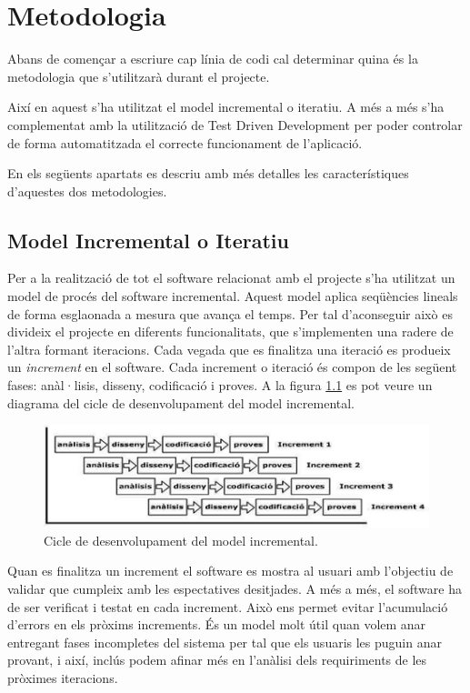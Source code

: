 \chapter{Metodologia}
\label{chap:metodologia}

Abans de començar a escriure cap línia de codi cal determinar quina és la metodologia que s'utilitzarà durant el projecte. 

Així en aquest s'ha utilitzat el model incremental o iteratiu. A més a més s'ha complementat amb la utilització de Test Driven Development per poder controlar de forma automatitzada el correcte funcionament de l'aplicació.

En els següents apartats es descriu amb més detalles les característiques d'aquestes dos metodologies.  


\section{Model Incremental o Iteratiu}

Per a la realització de tot el software relacionat amb el projecte s’ha utilitzat un model de procés del software incremental. Aquest model aplica seqüències lineals de forma esglaonada a mesura que avança el temps. Per tal d'aconseguir això es divideix el projecte en diferents funcionalitats, que s'implementen una radere de l'altra formant iteracions. Cada vegada que es finalitza una iteració es produeix un \emph{increment} en el software. Cada increment o iteració és compon de les següent fases: anàl·lisis, disseny, codificació i proves. A la figura \ref{fig:mii} es pot veure un diagrama del cicle de desenvolupament del model incremental.

\begin{figure}[htbp]
\centering\includegraphics[width=12cm]{img/model-incremental.png}
\caption{Cicle de desenvolupament del model incremental.}
\label{fig:mii}
\end{figure} 

Quan es finalitza un increment el software es mostra al usuari amb l'objectiu de validar que cumpleix amb les espectatives desitjades. A més a més, el software ha de ser verificat i testat en cada increment. Això ens permet evitar l'acumulació d'errors en els pròxims increments. És un model molt útil quan volem anar entregant fases incompletes del sistema per tal que els usuaris les puguin anar provant, i així, inclús podem afinar més en l’anàlisi dels requiriments de les pròximes iteracions.

